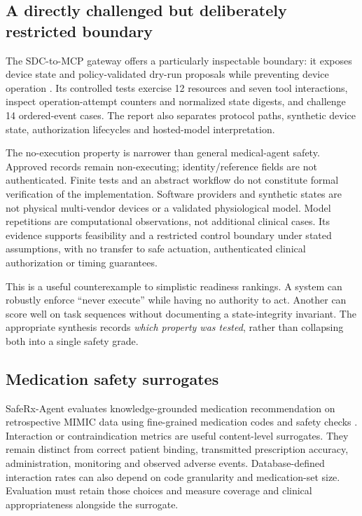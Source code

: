 \documentclass[journal,10pt]{IEEEtran}
\begin{document}
\subsection{A directly challenged but deliberately restricted boundary}
The SDC-to-MCP gateway offers a particularly inspectable boundary: it exposes device state and policy-validated dry-run proposals while preventing device operation \cite{sdcgateway}. Its controlled tests exercise 12 resources and seven tool interactions, inspect operation-attempt counters and normalized state digests, and challenge 14 ordered-event cases. The report also separates protocol paths, synthetic device state, authorization lifecycles and hosted-model interpretation.

The no-execution property is narrower than general medical-agent safety. Approved records remain non-executing; identity/reference fields are not authenticated. Finite tests and an abstract workflow do not constitute formal verification of the implementation. Software providers and synthetic states are not physical multi-vendor devices or a validated physiological model. Model repetitions are computational observations, not additional clinical cases. Its evidence supports feasibility and a restricted control boundary under stated assumptions, with no transfer to safe actuation, authenticated clinical authorization or timing guarantees.

This is a useful counterexample to simplistic readiness rankings. A system can robustly enforce ``never execute'' while having no authority to act. Another can score well on task sequences without documenting a state-integrity invariant. The appropriate synthesis records \emph{which property was tested}, rather than collapsing both into a single safety grade.

\subsection{Medication safety surrogates}
SafeRx-Agent evaluates knowledge-grounded medication recommendation on retrospective MIMIC data using fine-grained medication codes and safety checks \cite{saferx}. Interaction or contraindication metrics are useful content-level surrogates. They remain distinct from correct patient binding, transmitted prescription accuracy, administration, monitoring and observed adverse events. Database-defined interaction rates can also depend on code granularity and medication-set size. Evaluation must retain those choices and measure coverage and clinical appropriateness alongside the surrogate.
\end{document}
